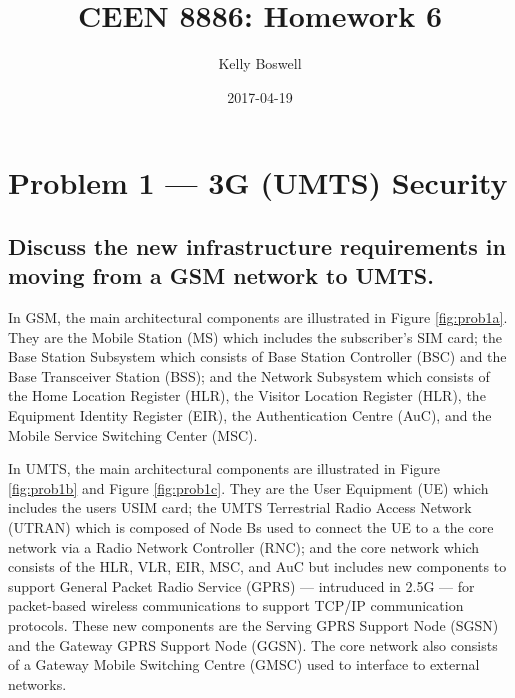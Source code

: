 \documentclass[a4paper]{report}
\title{CEEN 8886: Homework 6}
\date{2017-04-19}
\author{Kelly Boswell}
\begin{document}
\maketitle


\newpage


\section{Problem 1 --- 3G (UMTS) Security}

\subsection{Discuss the new infrastructure requirements in moving from a GSM
            network to UMTS.}

In GSM, the main architectural components are illustrated in Figure \ref{fig:prob1a}.
They are the Mobile Station (MS) which includes the subscriber's SIM card;
the Base Station Subsystem which consists of Base Station
Controller (BSC) and the Base Transceiver Station (BSS); and the Network Subsystem
which consists of the Home Location Register (HLR), the Visitor Location Register
(HLR), the Equipment Identity Register (EIR), the Authentication Centre (AuC), and
the Mobile Service Switching Center (MSC).

In UMTS, the main architectural components are illustrated in Figure \ref{fig:prob1b}
and Figure \ref{fig:prob1c}.  They are the User Equipment (UE) which includes the
users USIM card; the UMTS Terrestrial Radio Access Network (UTRAN) which is composed
of Node Bs used to connect the UE to a the core network via a Radio Network Controller
(RNC); and the core network which consists of the HLR, VLR, EIR, MSC, and AuC but includes
new components to support General Packet Radio Service (GPRS) --- intruduced in 2.5G --- 
for packet-based wireless communications to support TCP/IP communication protocols. These
new components are the Serving GPRS Support Node (SGSN) and the Gateway GPRS Support Node
(GGSN). The core network also consists of a Gateway Mobile Switching Centre (GMSC) used to
interface to external networks.
\end{document}
